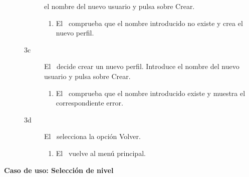 \begin{description}
\begin{description}
            el nombre del nuevo usuario y pulsa sobre Crear.
                \begin{enumerate}
                    \item El \sistema\ comprueba que el nombre introducido
                    no existe y crea el nuevo perfil.
                \end{enumerate}
            \item [3c] El \jugador\ decide crear un nuevo perfil. Introduce
            el nombre del nuevo usuario y pulsa sobre Crear.
                \begin{enumerate}
                    \item El \sistema\ comprueba que el nombre introducido
                    existe y muestra el correspondiente error.
                \end{enumerate}
            \item [3d] El \jugador\ selecciona la opción Volver.
                \begin{enumerate}
                    \item El \sistema\ vuelve al menú principal.\\
                \end{enumerate}
        \end{description}
    
\end{description}

\textbf{Caso de uso: Selección de nivel}

